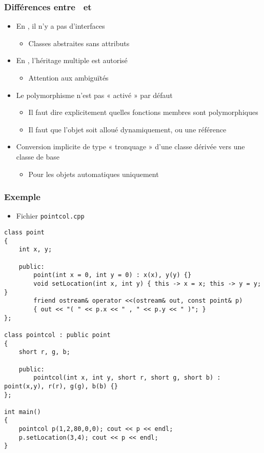 \begin{frame}
\frametitle{Différences entre \java\ et \cpp}
\begin{itemize}[<+->]
\item En \cpp, il n'y a pas d'interfaces
	\begin{itemize}
	\item Classes abstraites sans attributs
	\end{itemize}
\item En \cpp, l'héritage multiple est autorisé
	\begin{itemize}
	\item Attention aux ambiguïtés
	\end{itemize}
\item Le polymorphisme n'est pas « activé » par défaut
	\begin{itemize}
	\item Il faut dire explicitement quelles fonctions membres sont polymorphiques
	\item Il faut que l'objet soit alloué dynamiquement, ou une référence
	\end{itemize}
\item Conversion implicite de type « tronquage » d'une classe dérivée vers une classe de base
	\begin{itemize}
	\item Pour les objets automatiques uniquement
	\end{itemize}
\end{itemize}
\end{frame}

\begin{frame}[containsverbatim]
\frametitle{Exemple}
\begin{itemize}
\item Fichier \texttt{pointcol.cpp}
\end{itemize}
\begin{lstlisting}
class point
{
	int x, y;
	
	public:
		point(int x = 0, int y = 0) : x(x), y(y) {}		
		void setLocation(int x, int y) { this -> x = x; this -> y = y; }
		friend ostream& operator <<(ostream& out, const point& p)
		{ out << "( " << p.x << " , " << p.y << " )"; }	
};

class pointcol : public point
{
	short r, g, b;
	
	public:
		pointcol(int x, int y, short r, short g, short b) : point(x,y), r(r), g(g), b(b) {}
};

int main()
{
	pointcol p(1,2,80,0,0); cout << p << endl;
	p.setLocation(3,4); cout << p << endl;	
}
\end{lstlisting}
\end{frame}

